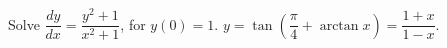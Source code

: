 {Solve $\dfrac{dy}{dx} = \dfrac{y^2+1}{x^2+1}$, for $y(0) = 1$.}
{$y=\tan\left(\dfrac{\pi}{4}+\arctan x\right) = \dfrac{1+x}{1-x}$.}